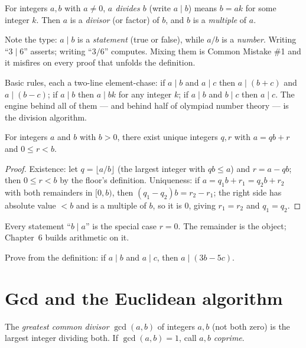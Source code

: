 \begin{definition}
For integers $a, b$ with $a \ne 0$, \emph{$a$ divides $b$} (write
$a \mid b$) means $b = ak$ for some integer $k$. Then $a$ is a
\emph{divisor} (or factor) of $b$, and $b$ is a
\emph{multiple} of $a$.
\end{definition}

Note the type: $a \mid b$ is a \emph{statement} (true or false), while
$a / b$ is a \emph{number}. Writing ``$3 \mid 6$'' asserts; writing
``$3 / 6$'' computes. Mixing them is Common Mistake \#1 and it misfires on
every proof that unfolds the definition.

Basic rules, each a two-line element-chase: if $a \mid b$ and $a \mid c$
then $a \mid (b + c)$ and $a \mid (b - c)$; if $a \mid b$ then $a \mid bk$
for any integer $k$; if $a \mid b$ and $b \mid c$ then $a \mid c$. The
engine behind all of them --- and behind half of olympiad number theory ---
is the division algorithm.

\begin{theorem}
For integers $a$ and $b$ with $b > 0$, there exist unique integers $q, r$
with $a = qb + r$ and $0 \le r < b$.
\end{theorem}

\begin{proof}
Existence: let $q = \lfloor a/b \rfloor$ (the largest integer with
$qb \le a$) and $r = a - qb$; then $0 \le r < b$ by the floor's definition.
Uniqueness: if $a = q_1 b + r_1 = q_2 b + r_2$ with both remainders in
$[0, b)$, then $(q_1 - q_2)b = r_2 - r_1$; the right side has absolute value
$< b$ and is a multiple of $b$, so it is $0$, giving $r_1 = r_2$ and
$q_1 = q_2$.
\end{proof}

Every statement ``$b \mid a$'' is the special case $r = 0$. The remainder is
the object; Chapter~6 builds arithmetic on it.

\begin{exercise}[easy]\label{exr:divrules}
Prove from the definition: if $a \mid b$ and $a \mid c$, then
$a \mid (3b - 5c)$.
\end{exercise}

\section{Gcd and the Euclidean algorithm}\label{sec:euclid}

\begin{definition}
The \emph{greatest common divisor} $\gcd(a,b)$ of integers $a, b$ (not both
zero) is the largest integer dividing both. If $\gcd(a,b) = 1$, call $a, b$
\emph{coprime}.
\end{definition}

